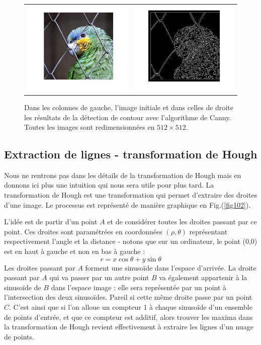 \begin{figure}[ht!]
\begin{tabular}{cc}
\includegraphics[width = .5\columnwidth]{fig/parrot_rescale.png} &
\includegraphics[width = .5\columnwidth]{fig/contour_parrot.png}
\end{tabular}
\caption{Dans les colonnes de gauche, l'image initiale et dans celles de droite les résultats de la détection de contour avec l'algorithme de Canny. Toutes les images sont redimensionnées en $512\times 512$. }
\label{fig101}
\end{figure}

\subsection{Extraction de lignes - transformation de Hough}

Nous ne rentrons pas dans les détails de la transformation de Hough mais en donnons ici plus une intuition qui nous sera utile pour plus tard. La transformation de Hough est une transformation qui permet d'extraire des droites d'une image. Le processus est représenté de manière graphique en Fig.(\ref{fig102}).

L'idée est de partir d'un point $A$ et de considérer toutes les droites passant par ce point. Ces droites sont paramétrées en coordonnées $(\rho,\theta)$ représentant respectivement l'angle et la distance - notons que sur un ordinateur, le point (0,0) est en haut à gauche et non en bas à gauche :
\begin{equation}
r = x \cos \theta + y \sin\theta
\end{equation}
Les droites passant par $A$ forment une sinusoïde dans l'espace d'arrivée. La droite passant par $A$ qui va passer par un autre point $B$ va également appartenir à la sinusoïde de $B$ dans l'espace image : elle sera représentée par un point à l'intersection des deux sinusoïdes. Pareil si cette même droite passe par un point $C$. C'est ainsi que si l'on alloue un compteur 1 à chaque sinusoïde d'un ensemble de points d'entrée, et que ce compteur est additif, alors trouver les maxima dans la transformation de Hough revient effectivement à extraire les lignes d'un nuage de points.

